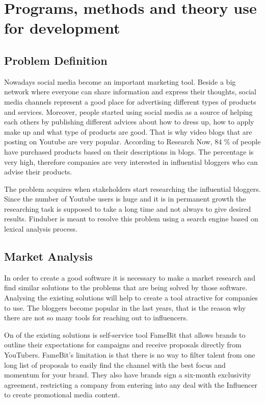 \section{Programs, methods and theory use for development}

\subsection{Problem Definition}

Nowadays social media become an important marketing tool. Beside a big network where everyone can share information and express their thoughts, social media channels represent a good place for advertising different types of products and services. Moreover, people started using social media as a source of helping each others by publishing different advices about how to dress up, how to apply make up and what type of products are good. That is why video blogs that are posting on Youtube are very popular. According to Research Now, 84 \% of people have purchased products based on their descriptions in blogs.\cite{cyber} The percentage is very high, therefore companies are very interested in influential bloggers who can advise their products. 

The problem acquires when stakeholders start researching the influential bloggers. Since the number of Youtube users is huge and it is in permanent growth the researching task is supposed to take a long time and not always to give desired results. Finduber is meant to resolve this problem using a search engine based on lexical analysis process. 

\subsection{Market Analysis}

In order to create a good software it is necessary to make a market research and find similar solutions to the problems that are being solved by those software. Analysing the existing solutions will help to create a tool atractive for companies to use. The bloggers become popular in the last years, that is the reason why there are not so many tools for reaching out to influencers.

On of the existing solutions is self-service tool FameBit that allows brands to outline their expectations for campaigns and receive proposals directly from YouTubers. FameBit’s limitation is that there is no way to filter talent from one long list of proposals to easily find the channel with the best focus and momentum for your brand. They also have brands sign a six-month exclusivity agreement, restricting a company from entering into any deal with the Influencer to create promotional media content.

